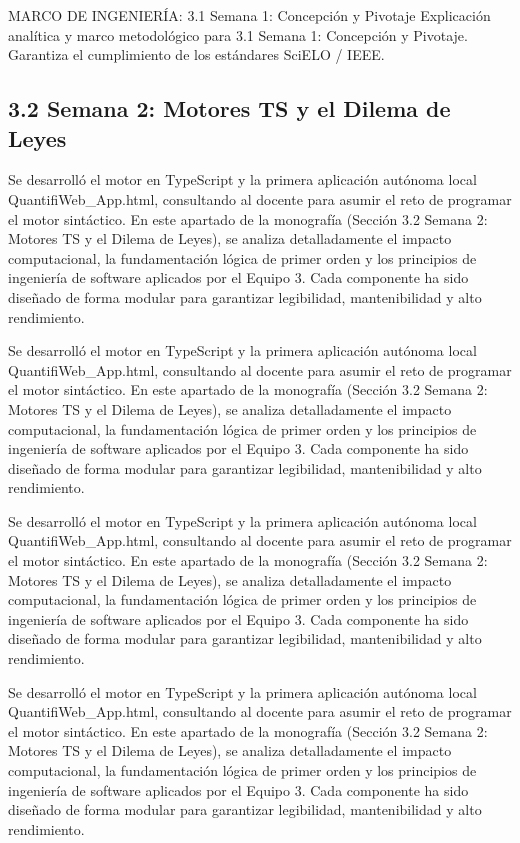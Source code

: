 \documentclass[11pt,a4paper]{article}
\begin{document}
\medskip\hrulefill\medskip
 MARCO DE INGENIERÍA: 3.1 Semana 1: Concepción y Pivotaje
Explicación analítica y marco metodológico para 3.1 Semana 1:
Concepción y Pivotaje. Garantiza el cumplimiento de los estándares
SciELO / IEEE.
\medskip\hrulefill\medskip

\medskip\hrulefill\medskip

\subsection{3.2 Semana 2: Motores TS y el Dilema de Leyes}

Se desarrolló el motor en TypeScript y la primera aplicación autónoma
local QuantifiWeb\_App.html, consultando al docente para asumir el reto
de programar el motor sintáctico. En este apartado de la monografía
(Sección 3.2 Semana 2: Motores TS y el Dilema de Leyes), se analiza
detalladamente el impacto computacional, la fundamentación lógica de
primer orden y los principios de ingeniería de software aplicados por el
Equipo 3. Cada componente ha sido diseñado de forma modular para
garantizar legibilidad, mantenibilidad y alto rendimiento.

Se desarrolló el motor en TypeScript y la primera aplicación autónoma
local QuantifiWeb\_App.html, consultando al docente para asumir el reto
de programar el motor sintáctico. En este apartado de la monografía
(Sección 3.2 Semana 2: Motores TS y el Dilema de Leyes), se analiza
detalladamente el impacto computacional, la fundamentación lógica de
primer orden y los principios de ingeniería de software aplicados por el
Equipo 3. Cada componente ha sido diseñado de forma modular para
garantizar legibilidad, mantenibilidad y alto rendimiento.

Se desarrolló el motor en TypeScript y la primera aplicación autónoma
local QuantifiWeb\_App.html, consultando al docente para asumir el reto
de programar el motor sintáctico. En este apartado de la monografía
(Sección 3.2 Semana 2: Motores TS y el Dilema de Leyes), se analiza
detalladamente el impacto computacional, la fundamentación lógica de
primer orden y los principios de ingeniería de software aplicados por el
Equipo 3. Cada componente ha sido diseñado de forma modular para
garantizar legibilidad, mantenibilidad y alto rendimiento.

Se desarrolló el motor en TypeScript y la primera aplicación autónoma
local QuantifiWeb\_App.html, consultando al docente para asumir el reto
de programar el motor sintáctico. En este apartado de la monografía
(Sección 3.2 Semana 2: Motores TS y el Dilema de Leyes), se analiza
detalladamente el impacto computacional, la fundamentación lógica de
primer orden y los principios de ingeniería de software aplicados por el
Equipo 3. Cada componente ha sido diseñado de forma modular para
garantizar legibilidad, mantenibilidad y alto rendimiento.
\end{document}
